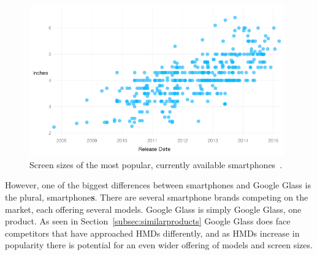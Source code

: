 	
	\begin{figure}[ht!]
		\centering
		\includegraphics[width=110mm]{images/smartphoneSize}
		\caption{Screen sizes of the most popular, currently available smartphones~\cite{smartphoneSizeChart}.}
		\label{smartphoneSizeChart}
	\end{figure}

However, one of the biggest differences between smartphones and Google Glass is the plural, smartphone\textbf{s}. There are several smartphone brands competing on the market, each offering several models. Google Glass is simply Google Glass, one product. As seen in Section~\ref{subsec:similarproducts} Google Glass does face competitors that have approached HMDs differently, and as HMDs increase in popularity there is potential for an even wider offering of models and screen sizes.








